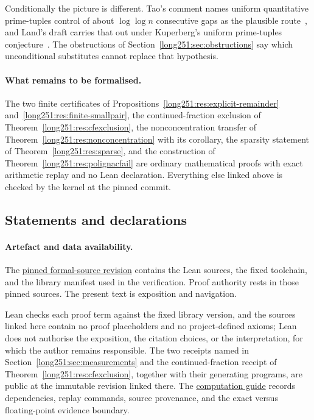 \documentclass[11pt]{article}
\begin{document}
Conditionally the picture is different.  Tao's comment names uniform
quantitative prime-tuples control of about $\log\log n$ consecutive gaps as the
plausible route~\cite[comment of 7 October 2025]{erdosproblems251thread}, and
Land's draft carries that out under Kuperberg's uniform prime-tuples
conjecture~\cite{land2026}.  The obstructions of
Section~\ref{long251:sec:obstructions} say which unconditional substitutes cannot
replace that hypothesis.

\paragraph{What remains to be formalised.}
The two finite certificates of
Propositions~\ref{long251:res:explicit-remainder} and~\ref{long251:res:finite-smallpair}, the
continued-fraction exclusion of Theorem~\ref{long251:res:cfexclusion}, the
nonconcentration transfer of Theorem~\ref{long251:res:nonconcentration} with its
corollary, the sparsity statement of Theorem~\ref{long251:res:sparse}, and the
construction of Theorem~\ref{long251:res:polignacfail} are ordinary mathematical proofs
with exact arithmetic replay and no Lean declaration.  Everything else linked
above is checked by the kernel at the pinned commit.

\subsection*{Statements and declarations}

\paragraph{Artefact and data availability.} The
\href{\sourceurl}{pinned formal-source revision} contains the Lean sources, the
fixed toolchain, and the library manifest used in the verification.  Proof
authority rests in those pinned sources.  The present text is exposition and
navigation.

Lean checks each proof term against the fixed library version, and the sources
linked here contain no proof placeholders and no project-defined axioms; Lean
does not authorise the exposition, the citation choices, or the
interpretation, for which the author remains responsible.  The two receipts
named in Section~\ref{long251:sec:measurements} and the continued-fraction receipt of
Theorem~\ref{long251:res:cfexclusion}, together with their generating programs,
are public at the immutable revision linked there.  The
\href{https://github.com/wcook04/plectis-erdos/blob/dd6cc708f650f061de06594eba6ba43878f4de31/research/experiments/erdos251/README.md}{computation guide}
records dependencies, replay commands, source provenance, and the exact versus
floating-point evidence boundary.
\end{document}
